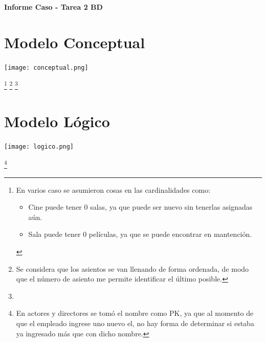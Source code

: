 \documentclass[11pt,letterpaper]{article}
\newcommand{\titulo}{Informe Caso - Tarea 2 BD}
\renewcommand{\maketitle}
{
\thispagestyle{fancy}
\begin{center}
\begin{Large}
\textbf{\titulo}\\
\end{Large}
\end{center}
\vspace{0.3cm}
}
\begin{document}
\maketitle
\section{Modelo Conceptual}
\vspace{0.6cm}
\begin{center}
	\texttt{[image: conceptual.png]}
\end{center}
\let\thefootnote\relax\footnote{En varios caso se asumieron cosas en las cardinalidades como:
	\begin{itemize}
		\item Cine puede tener 0 salas, ya que puede ser nuevo sin tenerlas asignadas aún.
		\item Sala puede tener 0 películas, ya que se puede encontrar en mantención.
	\end{itemize}
}
\footnote{Se considera que los asientos se van llenando de forma ordenada, de modo que el número de asiento me permite identificar el último posible.}
\footnote{}

\newpage
\section{Modelo Lógico}
\vspace{0.6cm}
\begin{center}
	\texttt{[image: logico.png]}
\end{center}
\footnote{En actores y directores se tomó el nombre como PK, ya que al momento de que el empleado ingrese uno nuevo el, no hay forma de determinar si estaba ya ingresado más que con dicho nombre.}
\end{document}
